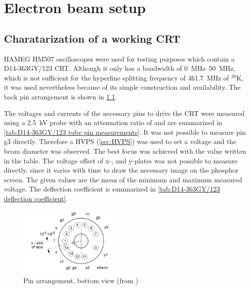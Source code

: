 \chapter{Electron beam setup}
\label{ch:Electron beam setup}

\section{Charatarization of a working CRT}
\label{sec:Charatarization of a working CRT}

HAMEG HM507 oscilloscopes \autocite{HM507-manual} were used for testing purposes which contain a D14-363GY/123\autocite{D14363GY123-manual} CRT. Although it only has a bandwidth of \SIrange{0}{50}{\mega\hertz}, which is not sufficient for the hyperfine splitting frequency of \SI{461.7}{\mega\hertz} of $^{39}\mathrm{K}$, it was used nevertheless because of its simple construction and availability. The back pin arrangement is shown in \cref{fig:pin arrangement}.

The voltages and currents of the necessary pins to drive the CRT were measured using a \SI{2.5}{\kilo\volt} probe with an attenuation ratio of  and are summarized in \cref{tab:D14-363GY/123 tube pin measurements}. It was not possible to measure pin g3 directly. Therefore a HVPS (\cref{sec:HVPS}) was used to set a voltage and the beam diameter was observed. The best focus was achieved with the value written in the table. The voltage offset of x-, and y-plates was not possible to measure directly, since it varies with time to draw the necessary image on the phosphor screen. The given values are the mean of the minimum and maximum measured voltage. The deflection coefficient is summarized in \cref{tab:D14-363GY/123 deflection coefficient}.

\begin{figure}[h]
	\centering
	\includegraphics[width=5cm]{./Chapters/e-beam-setup/pin arrangement}
	\caption{Pin arrangement, bottom view (from \autocite{D14363GY123-manual})}
	\label{fig:pin arrangement}
\end{figure}


